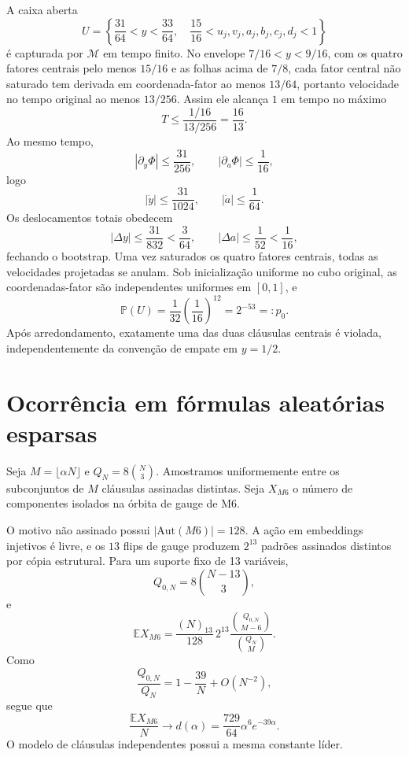\documentclass[11pt,a4paper]{article}
\newcommand{\Mmot}{\mathcal M}
\begin{document}
A caixa aberta
\begin{equation}
U=\left\{\frac{31}{64}<y<\frac{33}{64},\quad \frac{15}{16}<u_j,v_j,a_j,b_j,c_j,d_j<1\right\}
\end{equation}
é capturada por $\Mmot$ em tempo finito. No envelope $7/16<y<9/16$, com os quatro fatores centrais pelo menos $15/16$ e as folhas acima de $7/8$, cada fator central não saturado tem derivada em coordenada-fator ao menos $13/64$, portanto velocidade no tempo original ao menos $13/256$. Assim ele alcança $1$ em tempo no máximo
\[
T\le \frac{1/16}{13/256}=\frac{16}{13}.
\]
Ao mesmo tempo,
\[
|\partial_y\Phi|\le\frac{31}{256},\qquad |\partial_a\Phi|\le\frac1{16},
\]
logo
\[
|\dot y|\le\frac{31}{1024},\qquad |\dot a|\le\frac1{64}.
\]
Os deslocamentos totais obedecem
\[
|\Delta y|\le\frac{31}{832}<\frac3{64},\qquad |\Delta a|\le\frac1{52}<\frac1{16},
\]
fechando o bootstrap. Uma vez saturados os quatro fatores centrais, todas as velocidades projetadas se anulam. Sob inicialização uniforme no cubo original, as coordenadas-fator são independentes uniformes em $[0,1]$, e
\begin{equation}
\mathbb P(U)=\frac1{32}\left(\frac1{16}\right)^{12}=2^{-53}=:p_0.
\end{equation}
Após arredondamento, exatamente uma das duas cláusulas centrais é violada, independentemente da convenção de empate em $y=1/2$.

\section{Ocorrência em fórmulas aleatórias esparsas}
Seja $M=\lfloor\alpha N\rfloor$ e $Q_N=8\binom N3$. Amostramos uniformemente entre os subconjuntos de $M$ cláusulas assinadas distintas. Seja $X_{M6}$ o número de componentes isolados na órbita de gauge de M6.

O motivo não assinado possui $|\mathrm{Aut}(M6)|=128$. A ação em embeddings injetivos é livre, e os $13$ flips de gauge produzem $2^{13}$ padrões assinados distintos por cópia estrutural. Para um suporte fixo de 13 variáveis,
\[
Q_{0,N}=8\binom{N-13}{3},
\]
e
\begin{equation}
\mathbb E X_{M6}=\frac{(N)_{13}}{128}\,2^{13}\frac{\binom{Q_{0,N}}{M-6}}{\binom{Q_N}{M}}.
\end{equation}
Como
\[
\frac{Q_{0,N}}{Q_N}=1-\frac{39}{N}+O(N^{-2}),
\]
segue que
\begin{equation}
\frac{\mathbb E X_{M6}}{N}\longrightarrow d(\alpha)=\frac{729}{64}\alpha^6e^{-39\alpha}.
\end{equation}
O modelo de cláusulas independentes possui a mesma constante líder.
\end{document}

